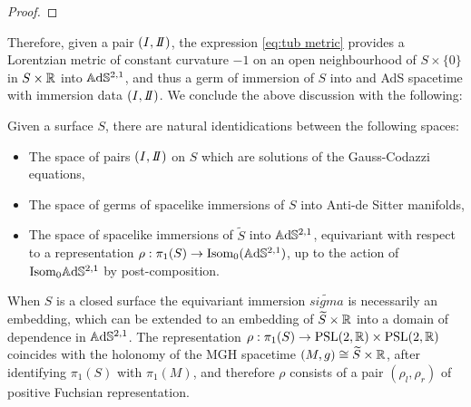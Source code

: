 \begin{proof}
\end{proof}
Therefore, given a pair $(\I,\II)$, the expression \ref{eq:tub metric} provides a Lorentzian metric of constant curvature $-1$ on an open neighbourhood of $S \times\{0\}$ in $S\times\mathbb{R}$ into $\mathbb{A}\mathrm{d}\mathbb{S}^{2,1}$, and thus a germ of immersion of $S$ into and AdS spacetime with immersion data $(\I,\II)$. We conclude the above discussion with the following:
\begin{proposition}\label{thm:immersion data classification}
    Given a surface $S$, there are natural identidications between the following spaces:
    \begin{itemize}
        \item The space of pairs $(\I,\II)$ on $S$ which are solutions of the Gauss-Codazzi equations,
        \item The space of germs of spacelike immersions of $S$ into Anti-de Sitter manifolds,
        \item The space of spacelike immersions of $\widetilde{S}$ into $\mathbb{A}\mathrm{d}\mathbb{S}^{2,1}$, equivariant with respect to a representation $\rho:\pi_1(S) \to \text{Isom}_0(\mathbb{A}\mathrm{d}\mathbb{S}^{2,1})$, up to the action of $\text{Isom}_0\mathbb{A}\mathrm{d}\mathbb{S}^{2,1}$ by post-composition.
    \end{itemize}
\end{proposition}
When $S$ is a closed surface the equivariant immersion $\widetilde{sigma}$ is necessarily an embedding, which can be extended to an embedding of $\widetilde{S}\times\mathbb{R}$ into a domain of dependence in $\mathbb{A}\mathrm{d}\mathbb{S}^{2,1}$. The representation $\rho:\pi_1(S) \to \text{PSL}(2,\mathbb{R}) \times \text{PSL}(2,\mathbb{R})$ coincides with the holonomy of the MGH spacetime $(M,g) \cong \widetilde{S}\times\mathbb{R}$, after identifying $\pi_1(S)$ with $\pi_1(M)$, and therefore $\rho$ consists of a pair $(\rho_l,\rho_r)$ of positive Fuchsian representation.

